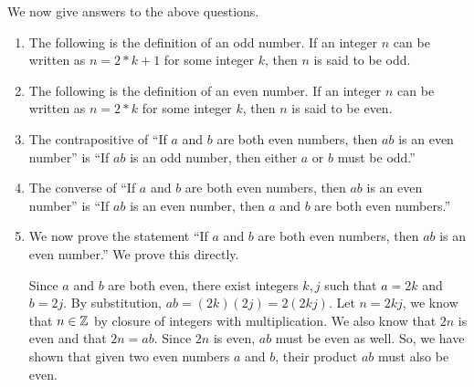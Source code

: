 \documentclass{article}
\begin{document}

We now give answers to the above questions.

\begin{enumerate}
    \item The following is the definition of an odd number.
    If an integer $n$ can be written as $ n = 2*k + 1 $ for some integer $k$, then $n$ is said to be odd.
    \item The following is the definition of an even number.
    If an integer $n$ can be written as $ n = 2*k$ for some integer $k$, then $n$ is said to be even.
    \item The contrapositive of ``If $a$ and $b$ are both even numbers, then $ab$ is an even number'' is ``If $ab$ is an odd number, then either $a$ or $b$ must be odd.''
    \item The converse of ``If $a$ and $b$ are both even numbers, then $ab$ is an even number'' is ``If $ab$ is an even number, then $a$ and $b$ are both even numbers.''
    \item We now prove the statement ``If $a$ and $b$ are both even numbers, then $ab$ is an even number.''
    We prove this directly.

    Since $a$ and $b$ are both even, there exist integers $k,j$ such that $a = 2k$ and $b = 2j$.
    By substitution, $ab = (2k) (2j) = 2(2kj) $.
    Let $n = 2kj$, we know that $n \in {\mathbb Z}$ by closure of integers with multiplication.
    We also know that $2n$ is even and that $2n = ab$.
    Since $2n$ is even, $ab$ must be even as well.
    So, we have shown that given two even numbers $a$ and $b$, their product $ab$ must also be even.
\end{enumerate}


\end{document}
